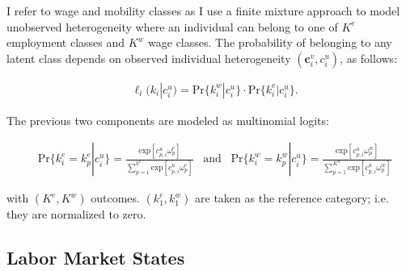 \documentclass[12pt, a4paper]{article}
\let\Oldsubsection\subsection
\renewcommand{\subsection}{\FloatBarrier\Oldsubsection}
\begin{document}
I refer to wage and mobility classes as I use a finite mixture approach to
model unobserved heterogeneity where an individual can belong to one of $K^{e}$ employment classes and $K^w$ wage classes. The probability of belonging to any latent class depends on observed individual heterogeneity $(\textbf{c}_i^v,c_i^u)$, as follows:

\begin{align}\label{eq:prob_unobs_het}
& \ell_{i}(k_i|c_i^u)=\text{Pr}\{k_i^w|c_i^u\}\cdot\text{Pr}\{k_i^e|c_i^u\}.
\end{align}

The previous two components are modeled as multinomial logits:


\begin{align}\label{eq:prob_unobs_het_multin}
& \text{Pr}\{k_i^{e}=k_{p}^{e}|c_{i}^u\}=\frac{\text{exp}[c_{p,i}^{u}\omega_{p}^{e}]}{\sum\limits_{p=1}^{k^{e}}\text{exp}[c_{p,i}^{u}\omega_{p}^{e}]} \,\,\,\,\, \text{and} \,\,\,\,\, \text{Pr}\{k_i^w=k_{p}^{w}|c_i^u\}=\frac{\text{exp}[c_{p,i}^{u}\omega_{p}^{w}]}{\sum\limits_{p=1}^{K^w}\text{exp}[c_{p,i}^{u}\omega_{p}^{w}]}
\end{align}


with $(K^{e},K^w)$ outcomes.  $(k^{e}_1,k^w_1)$ are taken as the reference category; i.e. they are normalized to zero.

\subsection{Labor Market States}\label{Sec:lab_market_states}

\end{document}
